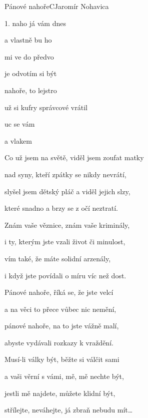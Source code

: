 \begin{song}{Pánové nahoře}{C}{Jaromír Nohavica}

\begin{SBVerse}

1.  naho já  vám dnes 

a  vlastně  bu ho 

 mi ve  do  předvo

je  odvotím  si  být 

 nahoře, to lejstro 

už  si kufry  správcové vrátil 

  uc se vám 

a  vlakem      
\end{SBVerse}

\begin{SBVerse}
Co už jsem na světě, viděl jsem zoufat matky

nad syny, kteří zpátky se nikdy nevrátí,

slyšel jsem dětský pláč a viděl jejich slzy,

které snadno a brzy se z očí neztratí.

Znám vaše věznice, znám vaše kriminály,

i ty, kterým jste vzali život či minulost,

vím také, že máte solidní arzenály,

i když jste povídali o míru víc než dost.
\end{SBVerse}

\begin{SBVerse}
Pánové nahoře, říká se, že jste velcí

a na věci to přece vůbec nic nemění,

pánové nahoře, na to jste vážně malí,

abyste vydávali rozkazy k vraždění.

Musí-li války být, běžte si válčit sami

a vaši věrní s vámi, mě, mě nechte být,

jestli mě najdete, můžete klidní být,

střílejte, neváhejte, já zbraň nebudu mít\dots
\end{SBVerse}

\end{song}

\pagebreak